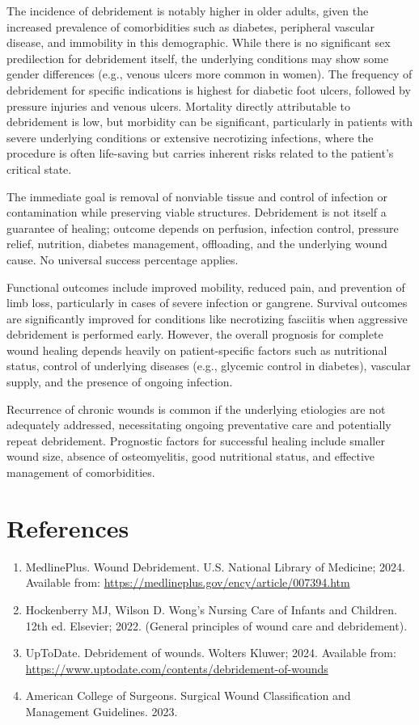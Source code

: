 The incidence of debridement is notably higher in older adults, given the increased prevalence of comorbidities such as diabetes, peripheral vascular disease, and immobility in this demographic. While there is no significant sex predilection for debridement itself, the underlying conditions may show some gender differences (e.g., venous ulcers more common in women). The frequency of debridement for specific indications is highest for diabetic foot ulcers, followed by pressure injuries and venous ulcers. Mortality directly attributable to debridement is low, but morbidity can be significant, particularly in patients with severe underlying conditions or extensive necrotizing infections, where the procedure is often life-saving but carries inherent risks related to the patient's critical state.

The immediate goal is removal of nonviable tissue and control of infection or contamination while preserving viable structures. Debridement is not itself a guarantee of healing; outcome depends on perfusion, infection control, pressure relief, nutrition, diabetes management, offloading, and the underlying wound cause. No universal success percentage applies.

Functional outcomes include improved mobility, reduced pain, and prevention of limb loss, particularly in cases of severe infection or gangrene. Survival outcomes are significantly improved for conditions like necrotizing fasciitis when aggressive debridement is performed early. However, the overall prognosis for complete wound healing depends heavily on patient-specific factors such as nutritional status, control of underlying diseases (e.g., glycemic control in diabetes), vascular supply, and the presence of ongoing infection. 

Recurrence of chronic wounds is common if the underlying etiologies are not adequately addressed, necessitating ongoing preventative care and potentially repeat debridement. Prognostic factors for successful healing include smaller wound size, absence of osteomyelitis, good nutritional status, and effective management of comorbidities.

\section*{References}
\begin{enumerate}
  \item MedlinePlus. Wound Debridement. U.S. National Library of Medicine; 2024. Available from: \url{https://medlineplus.gov/ency/article/007394.htm}
  
  \item Hockenberry MJ, Wilson D. Wong's Nursing Care of Infants and Children. 12th ed. Elsevier; 2022. (General principles of wound care and debridement).
  
  \item UpToDate. Debridement of wounds. Wolters Kluwer; 2024. Available from: \url{https://www.uptodate.com/contents/debridement-of-wounds}
  
  \item American College of Surgeons. Surgical Wound Classification and Management Guidelines. 2023.
\end{enumerate}

\clearpage
